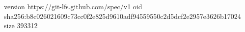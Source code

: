 version https://git-lfs.github.com/spec/v1
oid sha256:b8c026021609c73cc0f2e825d9610adf94559550c2d5dcf2e2957e3626b17024
size 393312
